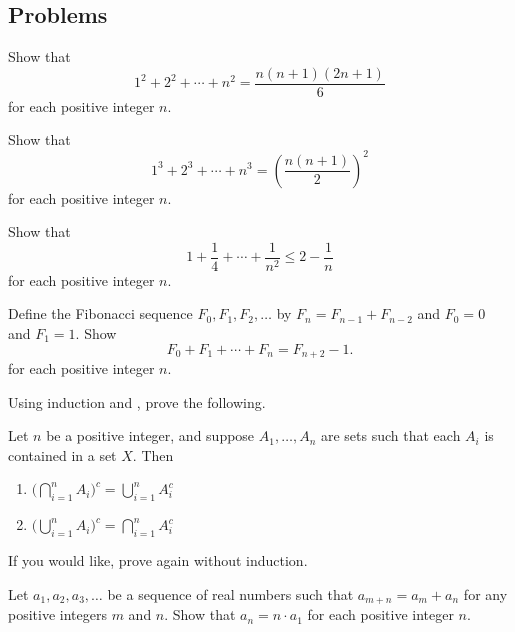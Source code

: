 \documentclass[../main.tex]{subfiles}
\begin{document}
\subsection{Problems}
\begin{homework}
    Show that
    \[1^2+2^2+\cdots +n^2=\frac{n(n+1)(2n+1)}{6}\]
    for each positive integer $n$.
\end{homework}
\begin{homework}
    Show that
    \[1^3+2^3+\cdots+n^3=\left(\frac{n(n+1)}2\right)^2\]
    for each positive integer $n$.
\end{homework}
\begin{homework} \label{hw:basel}
    Show that $$1+\frac{1}{4}+\cdots +\frac{1}{n^2} \le 2-\frac{1}{n}$$ for each positive integer $n$.
\end{homework}
\begin{homework} \label{hw:fib}
    Define the Fibonacci sequence $F_0,F_1,F_2,\ldots$ by $F_n=F_{n-1}+F_{n-2}$ and $F_0=0$ and $F_1=1$. Show
    \[F_0+F_1+\cdots+F_n=F_{n+2}-1.\]
    for each positive integer $n$.
\end{homework}
\begin{homework}
    Using induction and , prove the following.
    \begin{theorem} \label{thm:general-de-morgan}
        Let $n$ be a positive integer, and suppose $A_1, \dots, A_n$ are sets such that each $A_i$ is contained in a set $X$. Then
        \begin{enumerate}[label=(\alph*)]
            \item $\Big(\bigcap_{i = 1}^nA_i\Big)^c = \bigcup_{i = 1}^n A_i^c$
            \item $\Big(\bigcup_{i = 1}^nA_i\Big)^c = \bigcap_{i = 1}^n A_i^c$
        \end{enumerate}
    \end{theorem}
    If you would like, prove  again without induction.
\end{homework}
\begin{homework}
    Let $a_1,a_2,a_3,\ldots$ be a sequence of real numbers such that $a_{m+n}=a_m+a_n$ for any positive integers $m$ and $n$. Show that $a_n=n\cdot a_1$ for each positive integer $n$.
\end{homework}
\end{document}
